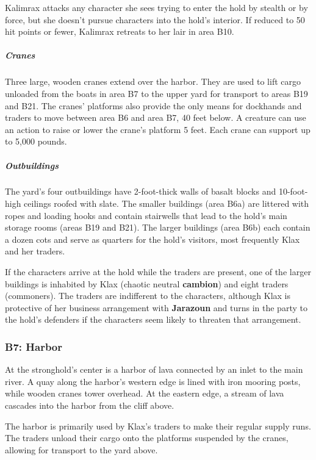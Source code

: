 \documentclass[10pt,a4paper,twoside,bg=print,twocolumn,openany,nodeprecatedcode]{dndbook}
\begin{document}
Kalimrax attacks any character she sees trying to enter the hold by stealth or by force, but she doesn't pursue characters into the hold's interior. If reduced to 50 hit points or fewer, Kalimrax retreats to her lair in area B10.

\subparagraph{Cranes}
Three large, wooden cranes extend over the harbor. They are used to lift cargo unloaded from the boats in area B7 to the upper yard for transport to areas B19 and B21. The cranes' platforms also provide the only means for dockhands and traders to move between area B6 and area B7, 40 feet below. A creature can use an action to raise or lower the crane's platform 5 feet. Each crane can support up to 5,000 pounds.

\subparagraph{Outbuildings}
The yard's four outbuildings have 2-foot-thick walls of basalt blocks and 10-foot-high ceilings roofed with slate. The smaller buildings (area B6a) are littered with ropes and loading hooks and contain stairwells that lead to the hold's main storage rooms (areas B19 and B21). The larger buildings (area B6b) each contain a dozen cots and serve as quarters for the hold's visitors, most frequently Klax and her traders.

If the characters arrive at the hold while the traders are present, one of the larger buildings is inhabited by Klax (chaotic neutral \textbf{cambion}) and eight traders (commoners). The traders are indifferent to the characters, although Klax is protective of her business arrangement with \textbf{Jarazoun} and turns in the party to the hold's defenders if the characters seem likely to threaten that arrangement.

\subsubsection{B7: Harbor}
\begin{DndReadAloud}{}
At the stronghold's center is a harbor of lava connected by an inlet to the main river. A quay along the harbor's western edge is lined with iron mooring posts, while wooden cranes tower overhead. At the eastern edge, a stream of lava cascades into the harbor from the cliff above.

\end{DndReadAloud}

The harbor is primarily used by Klax's traders to make their regular supply runs. The traders unload their cargo onto the platforms suspended by the cranes, allowing for transport to the yard above.
\end{document}
